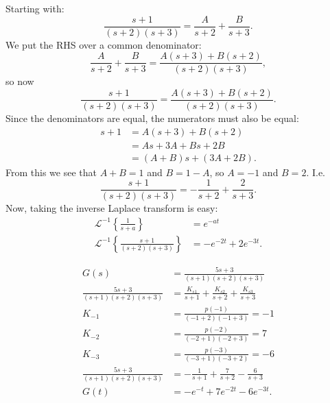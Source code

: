 Starting with:
\begin{equation*}
  \frac{s+1}{(s+2)(s+3)} = \frac{A}{s+2} + \frac{B}{s+3}
.\end{equation*}
We put the RHS over a common denominator:
\begin{equation*}
  \frac{A}{s+2} + \frac{B}{s+3} = \frac{A(s+3) + B(s+2)}{(s+2)(s+3)}
,\end{equation*}
so now
\begin{equation*}
  \frac{s+1}{(s+2)(s+3)} = \frac{A(s+3) + B(s+2)}{(s+2)(s+3)}
.\end{equation*}
Since the denominators are equal, the numerators must also be equal:
\begin{align*}
  s+1 &= A(s+3) + B(s+2) \\
      &= As + 3A + Bs + 2B \\
      &= (A+B)s + (3A + 2B)
.\end{align*}
From this we see that $A+ B= 1$ and $B = 1-A$, so $A=-1$ and $B = 2$.
I.e.
\begin{equation*}
  \frac{s+1}{(s+2)(s+3)} = - \frac{1}{s+2} + \frac{2}{s+3}
.\end{equation*}
Now, taking the inverse Laplace transform is easy:
\begin{align*}
  \mathcal{L}^{-1} \left\{ \frac{1}{s+a} \right\} &= e^{-at} \\
  \mathcal{L}^{-1} \left\{ \frac{s+1}{(s+2)(s+3)} \right\} &= -e^{-2t} + 2e^{-3t}
.\end{align*}

\begin{exa}
  \begin{align*}
    G(s) &= \frac{5s + 3}{(s+1)(s+2)(s+3)} \\
    \frac{5s+3}{(s+1)(s+2)(s+3)} &= \frac{K_{s1}}{s+1} + \frac{K_{s 2}}{s+ 2} + \frac{K_{s 3}}{s + 3} \\
    K_{-1} &= \frac{p(-1)}{(-1+2)(-1+3)} = -1\\
    K_{-2} &= \frac{p(-2)}{(-2+1)(-2+3)} = 7 \\
    K_{-3} &= \frac{p(-3)}{(-3+1)(-3+2)} = -6\\
    \frac{5s + 3}{(s+1) (s+2)(s+3)} &= - \frac{1}{s+1} + \frac{7}{s+2} - \frac{6}{s+3} \\
    G(t) &= -e^{-t} + 7 e^{-2t} - 6 e^{-3t}
  .\end{align*}
\end{exa}

